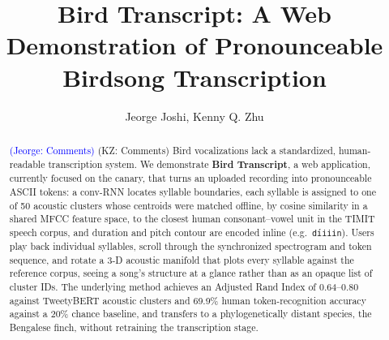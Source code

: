 \documentclass[letterpaper]{article} %
\title{Bird Transcript: A Web Demonstration of Pronounceable Birdsong Transcription}
\author{
    Jeorge Joshi,
    Kenny Q. Zhu
}
\newcommand{\JJ}[1]{\colorbox{lightbluewash}{\textcolor{blue}{(Jeorge: #1)}}}
\newcommand{\KZ}[1]{\colorbox{lightorangewash}{\textcolor{orange!80!black}{(KZ: #1)}}}
\begin{document}
\maketitle

\begin{abstract}
\JJ{Comments}
\KZ{Comments}
Bird vocalizations lack a standardized, human-readable transcription system.
We demonstrate \textbf{Bird Transcript}, a web application, currently
focused on the canary, that turns an uploaded recording into pronounceable
ASCII tokens: a conv-RNN
locates syllable boundaries, each syllable is assigned to one of 50 acoustic
clusters whose centroids were matched offline, by cosine similarity in a
shared MFCC feature space, to the closest human consonant--vowel unit in the
TIMIT speech corpus, and duration
and pitch contour are encoded inline (e.g.\ \texttt{d\'{\i}iiin}). Users
play back individual syllables, scroll through the synchronized spectrogram
and token sequence, and rotate a 3-D acoustic manifold that plots every
syllable against the reference corpus, seeing a song's structure at a
glance rather than as an opaque list of cluster IDs. The underlying method
achieves an Adjusted Rand Index of 0.64--0.80 against TweetyBERT acoustic
clusters and 69.9\% human token-recognition accuracy against a 20\% chance
baseline, and transfers to a phylogenetically distant species, the Bengalese
finch, without retraining the transcription stage.
\end{abstract}

\begin{links}
\end{links}
\end{document}
